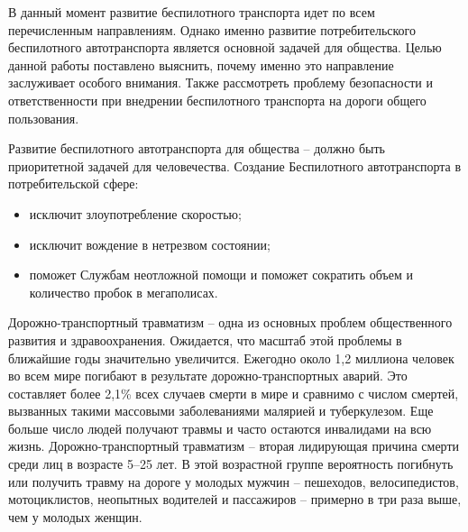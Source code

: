 В данный момент развитие беспилотного транспорта идет по всем перечисленным 
направлениям. Однако именно развитие потребительского беспилотного 
автотранспорта является основной задачей для общества. Целью данной работы
поставлено выяснить, почему именно это направление заслуживает особого внимания.
Также рассмотреть проблему безопасности и ответственности при внедрении 
беспилотного транспорта на дороги общего пользования.


Развитие беспилотного автотранспорта для общества – должно быть приоритетной 
задачей для человечества. Создание Беспилотного автотранспорта в потребительской 
сфере:

\begin{itemize}
    \item исключит злоупотребление скоростью;
    \item исключит вождение в нетрезвом состоянии;
    \item поможет Службам неотложной помощи и поможет сократить объем и 
          количество пробок в мегаполисах.
  \end{itemize}

Дорожно-транспортный травматизм – одна из основных проблем общественного 
развития и здравоохранения. Ожидается, что масштаб этой проблемы в ближайшие 
годы значительно увеличится. Ежегодно около 1,2 миллиона человек во всем мире 
погибают в результате дорожно-транспортных аварий. Это составляет более 2,1\% 
всех случаев смерти в мире и сравнимо с числом смертей, вызванных такими 
массовыми заболеваниями малярией и туберкулезом. 
Еще больше число людей получают травмы и часто остаются инвалидами на всю жизнь.
Дорожно-транспортный травматизм – вторая лидирующая причина смерти среди лиц 
в возрасте 5–25 лет. В этой возрастной группе вероятность погибнуть или получить 
травму на дороге у молодых мужчин – пешеходов, велосипедистов, мотоциклистов, 
неопытных водителей и пассажиров – примерно в три раза выше, чем у молодых женщин.

